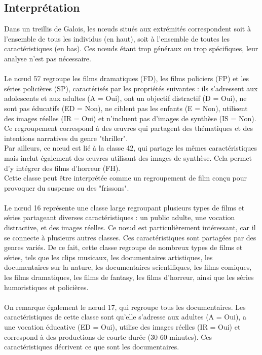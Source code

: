 \documentclass{article}
\begin{document}
\subsection{Interprétation}

Dans un treillis de Galois, les nœuds situés aux extrémités correspondent soit à l’ensemble de tous les individus (en haut), soit à l’ensemble de toutes les caractéristiques (en bas). Ces nœuds étant trop généraux ou trop spécifiques, leur analyse n’est pas nécessaire.
\\
\\
Le nœud 57 regroupe les films dramatiques (FD), les films policiers (FP) et les séries policières (SP), caractérisés par les propriétés suivantes : ils s’adressent aux adolescents et aux adultes (A = Oui), ont un objectif distractif (D = Oui), ne sont pas éducatifs (ED = Non), ne ciblent pas les enfants (E = Non), utilisent des images réelles (IR = Oui) et n’incluent pas d’images de synthèse (IS = Non). Ce regroupement correspond à des œuvres qui partagent des thématiques et des intentions narratives du genre "thriller".
\\
Par ailleurs, ce nœud est lié à la classe 42, qui partage les mêmes caractéristiques mais inclut également des œuvres utilisant des images de synthèse. Cela permet d’y intégrer des films d’horreur (FH).
\\
Cette classe peut être interprétée comme un regroupement de film conçu pour provoquer du suspense ou des "frissons".
\\
\\
Le nœud 16 représente une classe large regroupant plusieurs types de films et séries partageant diverses caractéristiques : un public adulte, une vocation distractive, et des images réelles. Ce nœud est particulièrement intéressant, car il se connecte à plusieurs autres classes. Ces caractéristiques sont partagées par des genres variés. De ce fait, cette classe regroupe de nombreux types de films et séries, tels que les clips musicaux, les documentaires artistiques, les documentaires sur la nature, les documentaires scientifiques, les films comiques, les films dramatiques, les films de fantasy, les films d’horreur, ainsi que les séries humoristiques et policières.
\\
\\
On remarque également le nœud 17, qui regroupe tous les documentaires. Les caractéristiques de cette classe sont qu’elle s’adresse aux adultes (A = Oui), a une vocation éducative (ED = Oui), utilise des images réelles (IR = Oui) et correspond à des productions de courte durée (30-60 minutes). Ces caractéristiques décrivent ce que sont les documentaires.
\\
\end{document}
